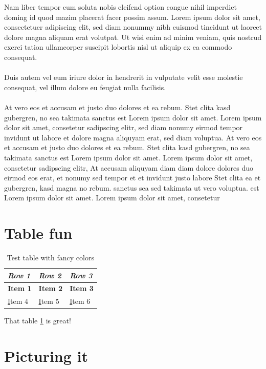 \documentclass[a4paper,12pt]{amsart}
\begin{document}
Nam liber tempor cum soluta nobis eleifend option congue nihil imperdiet doming id quod mazim placerat facer possim assum. Lorem ipsum dolor sit amet, consectetuer adipiscing elit, sed diam nonummy nibh euismod tincidunt ut laoreet dolore magna aliquam erat volutpat. Ut wisi enim ad minim veniam, quis nostrud exerci tation ullamcorper suscipit lobortis nisl ut aliquip ex ea commodo consequat.\\\\   

Duis autem vel eum iriure dolor in hendrerit in vulputate velit esse molestie consequat, vel illum dolore eu feugiat nulla facilisis.\\\\   

At vero eos et accusam et justo duo dolores et ea rebum. Stet clita kasd gubergren, no sea takimata sanctus est Lorem ipsum dolor sit amet. Lorem ipsum dolor sit amet, consetetur sadipscing elitr, sed diam nonumy eirmod tempor invidunt ut labore et dolore magna aliquyam erat, sed diam voluptua. At vero eos et accusam et justo duo dolores et ea rebum. Stet clita kasd gubergren, no sea takimata sanctus est Lorem ipsum dolor sit amet. Lorem ipsum dolor sit amet, consetetur sadipscing elitr, At accusam aliquyam diam diam dolore dolores duo eirmod eos erat, et nonumy sed tempor et et invidunt justo labore Stet clita ea et gubergren, kasd magna no rebum. sanctus sea sed takimata ut vero voluptua. est Lorem ipsum dolor sit amet. Lorem ipsum dolor sit amet, consetetur

\section{Table fun}

\begin{longtable}[c]{@{}l|l|l@{}}
\caption{Test table with fancy colors}
\label{my-table}\\
\rowcolor[HTML]{FFCCC9} 
\textit{Row 1} & \textit{Row 2} & \textit{Row 3} \\* \midrule
\endfirsthead
%
\endhead
%
{\color[HTML]{3531FF} \textbf{Item 1}} & {\color[HTML]{3531FF} \textbf{Item 2}} & {\color[HTML]{3531FF} \textbf{Item 3}} \\
{\color[HTML]{036400} {\ul Item 4}} & {\color[HTML]{036400} {\ul Item 5}} & {\color[HTML]{036400} {\ul Item 6}}
\end{longtable}

That table \ref{my-table} is great!

\newpage\section{Picturing it}
\end{document}
